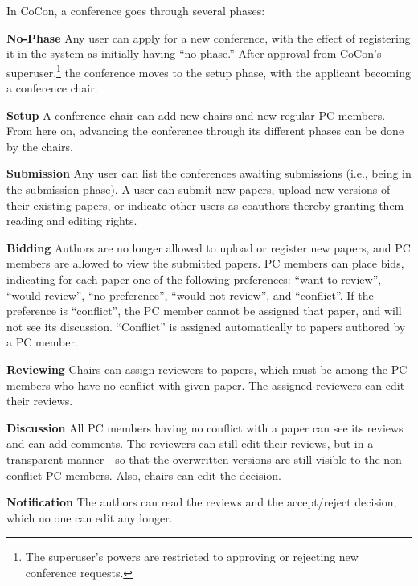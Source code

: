 \documentclass[11pt,a4paper]{article}
\begin{document}
In CoCon, a conference goes through several %
phases:
\begin{description}
\item{\bf No-Phase}
Any user can apply for a new conference, with the effect of registering it in the system as initially having ``no phase.''
After approval from CoCon's superuser,\footnote{The superuser's powers are restricted to approving or rejecting new conference requests.}
the conference moves to the setup phase, with the applicant
becoming
a conference chair.
%
\item{\bf Setup} A conference chair can add new chairs %
and new regular PC members. %
From here on, advancing the conference through its different phases can be done
by the chairs.
%
\item{\bf Submission}
Any user can list the conferences %
awaiting submissions (i.e., being in the submission phase).
A user can
submit new papers, %
upload new versions of their existing papers, or indicate other users as coauthors
thereby granting them reading and editing rights.
%
\item{{\bf Bidding}}
Authors are no longer allowed to upload or register new papers, and PC members are allowed to view the submitted papers.
PC members can place bids, indicating for each paper one of the following preferences:
``want to review'', ``would review'', ``no preference'', ``would not review'', and ``conflict''.
If the preference is ``conflict'', the PC member cannot be assigned that paper, and will not see its discussion.
``Conflict'' is assigned automatically to papers authored by a PC member.
%
\item{{\bf Reviewing}}
Chairs can assign reviewers to papers, which must be among the PC members who have no conflict with given paper.
%
The assigned reviewers can edit their reviews.
%
\item{{\bf Discussion}}
All PC members having no conflict with a paper can see its reviews and can add comments.
The reviewers can still edit their reviews, but in a transparent manner---so that the overwritten  versions are still visible to the non-conflict PC members.
Also, chairs can edit the decision.
%
\item{{\bf Notification}}
The authors can read the reviews and the accept/reject decision, which no one can edit any longer.
\end{description}
\end{document}
